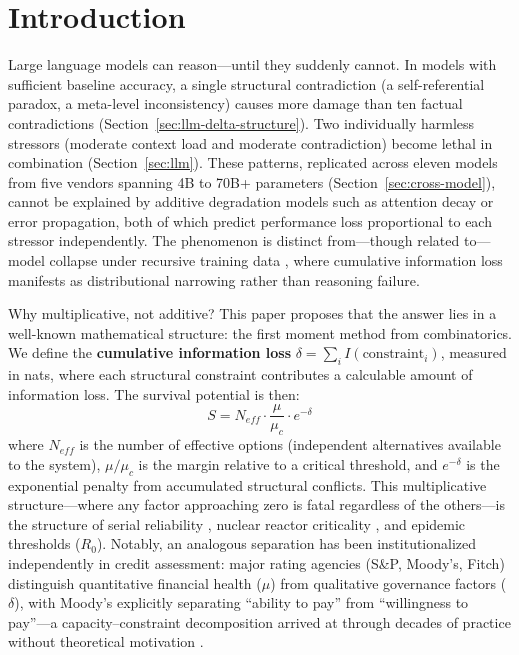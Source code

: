 \documentclass[11pt,a4paper]{article}
\begin{document}
\section{Introduction}

Large language models can reason---until they suddenly cannot. In models with sufficient baseline accuracy, a single structural contradiction (a self-referential paradox, a meta-level inconsistency) causes more damage than ten factual contradictions (Section~\ref{sec:llm-delta-structure}). Two individually harmless stressors (moderate context load and moderate contradiction) become lethal in combination (Section~\ref{sec:llm}). These patterns, replicated across eleven models from five vendors spanning 4B to 70B+ parameters (Section~\ref{sec:cross-model}), cannot be explained by additive degradation models such as attention decay or error propagation, both of which predict performance loss proportional to each stressor independently. The phenomenon is distinct from---though related to---model collapse under recursive training data \citep{shumailov2024}, where cumulative information loss manifests as distributional narrowing rather than reasoning failure.

Why multiplicative, not additive? This paper proposes that the answer lies in a well-known mathematical structure: the first moment method from combinatorics. We define the \textbf{cumulative information loss} $\delta = \sum_i I(\text{constraint}_i)$, measured in nats, where each structural constraint contributes a calculable amount of information loss. The survival potential is then:
\begin{equation}
S = N_{eff} \cdot \frac{\mu}{\mu_c} \cdot e^{-\delta}
\label{eq:survival}
\end{equation}
where $N_{eff}$ is the number of effective options (independent alternatives available to the system), $\mu/\mu_c$ is the margin relative to a critical threshold, and $e^{-\delta}$ is the exponential penalty from accumulated structural conflicts. This multiplicative structure---where any factor approaching zero is fatal regardless of the others---is the structure of serial reliability \citep{barlow1975}, nuclear reactor criticality \citep{duderstadt1976}, and epidemic thresholds ($R_0$). Notably, an analogous separation has been institutionalized independently in credit assessment: major rating agencies (S\&P, Moody's, Fitch) distinguish quantitative financial health ($\mu$) from qualitative governance factors ($\delta$), with Moody's explicitly separating ``ability to pay'' from ``willingness to pay''---a capacity--constraint decomposition arrived at through decades of practice without theoretical motivation \citep{cantor1996}.
\end{document}
